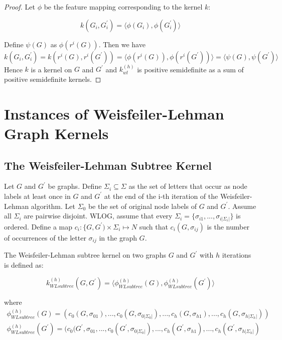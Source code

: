 \documentclass{llncs}
\begin{document}
%
\begin{proof}

Let $\phi$ be the feature mapping corresponding to the kernel $k$: 

\begin{equation}
k(G_i, G_i^{\prime}) = \langle \phi(G_i), \phi(G_i^{\prime}) \rangle
\end{equation}

Define $\psi(G)$ as $\phi(r^{i}(G))$. Then we have 
\begin{equation}
k(G_i, G_i^{\prime}) = k(r^i (G), r^i (G^{\prime})) = \langle \phi(r^i (G)), \phi( r^i (G^{\prime})) \rangle = \langle \psi(G), \psi(G^{\prime}) \rangle
\end{equation}
Hence $k$ is a kernel on $G$ and $G^{\prime}$ and $k_{wl}^{(h)}$ is positive semidefinite as a sum of positive semidefinite kernels. 

\end{proof}



%
\section{Instances of Weisfeiler-Lehman Graph Kernels}
%
%
\subsection{The Weisfeiler-Lehman Subtree Kernel}
%

\begin{definition}
Let $G$ and $G^{\prime}$ be graphs. Define $\Sigma_i \subseteq \Sigma$ as the set of letters that occur as node labels at least once in $G$ and $G^{\prime}$ at the end of the i-th iteration of the Weisfeiler-Lehman algorithm. Let $\Sigma_0$ be the set of original node labels of $G$ and $G^{\prime}$. Assume all $\Sigma_i$ are pairwise disjoint. WLOG, assume that every $\Sigma_i = \{\sigma_{i1}, ..., \sigma_{i|\Sigma_i|} \}$ is ordered. Define a map $c_i: \{G, G^{\prime}) \times \Sigma_i \mapsto N$ such that $c_i(G, \sigma_{ij})$ is the number of occurrences of the letter $\sigma_{ij}$ in the graph $G$.  

The Weisfeiler-Lehman subtree kernel on two graphs $G$ and $G^{\prime}$ with $h$ iterations is defined as: 

\begin{equation}
k_{WLsubtree}^{(h)}(G, G^{\prime}) = \langle \phi_{WLsubtree}^{(h)} (G),  \phi_{WLsubtree}^{(h)} (G^{\prime})\rangle
\end{equation}

where 
\begin{align*}
\phi_{WLsubtree}^{(h)}(G) = (c_0(G, \sigma_{01}), ..., c_0(G, \sigma_{0 |\Sigma_0|}), ..., c_h(G, \sigma_{h1}),...,  c_h(G, \sigma_{h|\Sigma_h|})) 
\end{align*}
\begin{align*}
\phi_{WLsubtree}^{(h)}(G^{\prime}) = (c_0(G^{\prime}, \sigma_{01}, ..., c_0(G^{\prime}, \sigma_{0 |\Sigma_0|}), ..., c_h(G^{\prime}, \sigma_{h1}),...,  c_h(G^{\prime}, \sigma_{h|\Sigma_h|})
\end{align*}
\end{definition}
\end{document}
